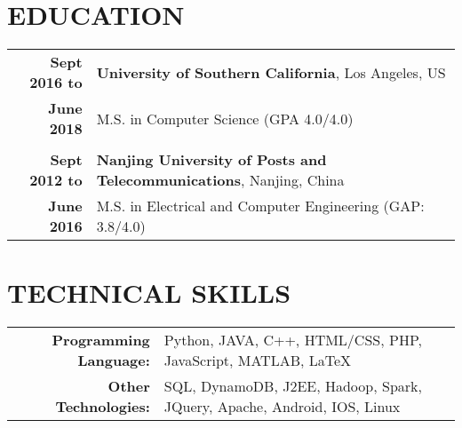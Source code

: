 \documentclass[a4paper, 11pt]{extarticle} %
\begin{document}
\section{EDUCATION}
\vspace{-0.2cm}
\begin{longtable}{r | p{20cm}}	
\textbf{Sept 2016 to}
		
		 &
		
		 \textbf{University of Southern California}, Los Angeles, US  \\
		
		\textbf{June 2018}
		
		&

\footnotesize{

\vspace{-0.3cm}
\small{M.S. in Computer Science (GPA 4.0/4.0)
}

}\\
\multicolumn{2}{c}{}
\vspace{-0.5cm}
\\
\textbf{Sept 2012 to}
		
		 &
		
		 \textbf{Nanjing University of Posts and Telecommunications}, Nanjing, China  \\
		
			\textbf{June 2016}
		&
\footnotesize{

\vspace{-0.3cm}

\small{M.S. in Electrical and Computer Engineering (GAP: 3.8/4.0)}
}
\end{longtable}

\vspace{-0.4cm}

\section{TECHNICAL SKILLS}
\vspace{-0.2cm}
\begin{tabular}{rl}
\textbf{Programming Language:} & \hspace{8mm} Python, JAVA, C++, HTML/CSS, PHP, JavaScript, MATLAB, \LaTeX\\
\textbf{Other Technologies:} & \hspace{8mm} SQL, DynamoDB, J2EE, Hadoop, Spark, JQuery, Apache, Android, IOS, Linux\\

\end{tabular}
\vspace{-0.1cm}
\end{document}
